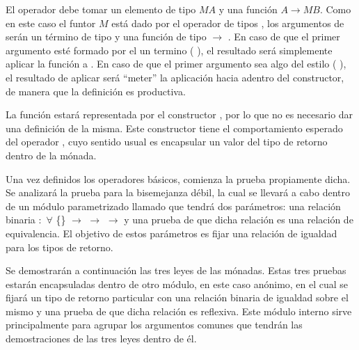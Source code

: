 \begin{AgdaAlign}

El operador  debe tomar un elemento de tipo $\mathit{M} A$ y una función $A \rightarrow \mathit{M} B$. Como en este caso el funtor $\mathit{M}$ está dado por el operador de tipos \AgdaDatatype{\_$\bot$}, los argumentos de  serán un término  de tipo  \AgdaDatatype{$\bot$} y una función  de tipo  $\rightarrow$  \AgdaDatatype{$\bot$}. En caso de que el primer argumento esté formado por el un termino ( ), el resultado será simplemente aplicar la función  a . En caso de que el primer argumento sea algo del estilo ( ), el resultado de aplicar  será ``meter'' la aplicación hacia adentro del constructor, de manera que la definición es productiva.

La función  estará representada por el constructor , por lo que no es necesario dar una definición de la misma. Este constructor tiene el comportamiento esperado del operador , cuyo sentido usual es encapsular un valor del tipo de retorno dentro de la mónada.

Una vez definidos los operadores básicos, comienza la prueba propiamente dicha. Se analizará la prueba para la bisemejanza débil, la cual se llevará a cabo dentro de un módulo parametrizado llamado  que tendrá dos parámetros: una relación binaria \AgdaBound{$\_\sim\_$} $:$ $\forall$ \{\} $\rightarrow$  $\rightarrow$  $\rightarrow$  y una prueba de que dicha relación es una relación de equivalencia. El objetivo de estos parámetros es fijar una relación de igualdad para los tipos de retorno. 


Se demostrarán a continuación las tres leyes de las mónadas. Estas tres pruebas estarán encapsuladas dentro de otro módulo, en este caso anónimo, en el cual se fijará un tipo de retorno particular  con una relación binaria de igualdad sobre el mismo y una prueba de que dicha relación es reflexiva. Este módulo interno sirve principalmente para agrupar los argumentos comunes que tendrán las demostraciones de las tres leyes dentro de él. 


\end{AgdaAlign}
